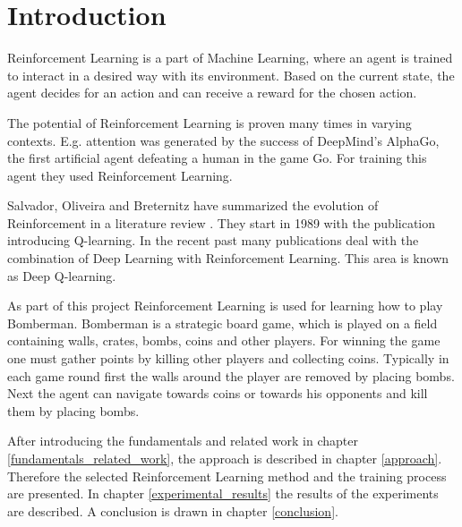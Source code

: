 \section{Introduction}

Reinforcement Learning is a part of Machine Learning, where an agent is trained to interact in a desired way with its environment. Based on the current state, the agent decides for an action and can receive a reward for the chosen action. \cite{Salvador2020}

The potential of Reinforcement Learning is proven many times in varying contexts. E.g. attention was generated by the success of DeepMind's AlphaGo, the first artificial agent defeating a human in the game Go. For training this agent they used Reinforcement Learning. \cite{Silver1140}

Salvador, Oliveira and Breternitz have summarized the evolution of Rein\-force\-ment in a literature review \cite{Salvador2020}. They start in 1989 with the publication introducing Q-learning. In the recent past many publications deal with the combination of Deep Learning with Reinforcement Learning. This area is known as Deep Q-learning.

As part of this project Reinforcement Learning is used for learning how to play Bomberman. Bomberman is a strategic board game, which is played on a field containing walls, crates, bombs, coins and other players. For winning the game one must gather points by killing other players and collecting coins. Typically in each game round first the walls around the player are removed by placing bombs. Next the agent can navigate towards coins or towards his opponents and kill them by placing bombs. \cite{Kormelink2018}

After introducing the fundamentals and related work in chapter \ref{fundamentals_related_work}, the approach is described in chapter \ref{approach}. Therefore the selected Reinforcement Learning method and the training process are presented. In chapter \ref{experimental_results} the results of the experiments are described. A conclusion is drawn in chapter \ref{conclusion}.